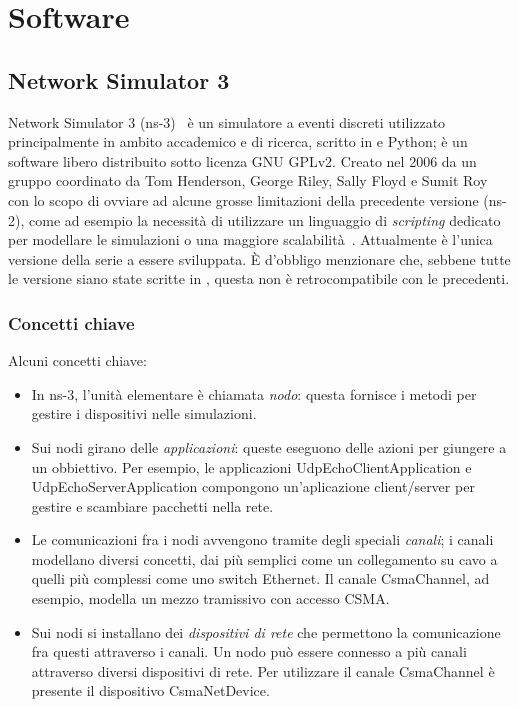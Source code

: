%
\chapter{Software}
%
\section{Network Simulator 3}
Network Simulator 3 (ns-3)~\cite{ns3Website} è un simulatore a eventi discreti utilizzato principalmente in ambito accademico e di ricerca,
scritto in \Cpp e Python; è un software libero distribuito sotto licenza GNU GPLv2.
Creato nel 2006 da un gruppo coordinato da Tom Henderson, George Riley, Sally Floyd e Sumit Roy con lo scopo
di ovviare ad alcune grosse limitazioni della precedente versione (ns-2), come ad esempio la necessità di utilizzare
un linguaggio di \textit{scripting} dedicato per modellare le simulazioni o una maggiore scalabilità~\cite{Henderson:2006:NPG:1190455.1190468}.
Attualmente è l'unica versione della serie a essere sviluppata.
È d'obbligo menzionare che, sebbene tutte le versione siano state scritte in \Cpp, questa non è retrocompatibile con le precedenti.
%
\subsection{Concetti chiave}
Alcuni concetti chiave:
\begin{itemize}
	\item In ns-3, l'unità elementare è chiamata \textit{nodo}: questa fornisce i metodi per gestire i dispositivi nelle simulazioni.
	\item Sui nodi girano delle \textit{applicazioni}: queste eseguono delle azioni per giungere a un obbiettivo.
				Per esempio, le applicazioni \textsf{UdpEchoClientApplication} e \textsf{UdpEchoServerApplication} compongono
				un'aplicazione client/server per gestire e scambiare pacchetti nella rete.
	\item Le comunicazioni fra i nodi avvengono tramite degli speciali \textit{canali};
				i canali modellano diversi concetti, dai più semplici come un collegamento su cavo a quelli più complessi
				come uno switch Ethernet.
				Il canale \textsf{CsmaChannel}, ad esempio, modella un mezzo tramissivo con accesso CSMA.
	\item Sui nodi si installano dei \textit{dispositivi di rete} che permettono la comunicazione fra questi attraverso i canali.
				Un nodo può essere connesso a più canali attraverso diversi dispositivi di rete.
				Per utilizzare il canale \textsf{CsmaChannel} è presente il dispositivo \textsf{CsmaNetDevice}.
\end{itemize}
